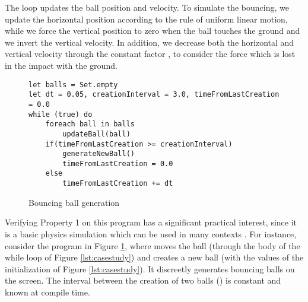 The  loop updates the ball position and velocity. 
To simulate the bouncing, we update the horizontal position according to the rule of uniform linear motion, while we force the vertical position to zero when the ball touches the ground and we invert the vertical velocity. In addition, we decrease both the horizontal and vertical velocity through the constant factor , to consider the force which is lost in the impact with the ground.

\begin{figure}
\vspace{-15pt}
\begin{lstlisting}
let balls = Set.empty
let dt = 0.05, creationInterval = 3.0, timeFromLastCreation = 0.0
while (true) do
	foreach ball in balls
		updateBall(ball)	
	if(timeFromLastCreation >= creationInterval)
		generateNewBall()
		timeFromLastCreation = 0.0
	else
		timeFromLastCreation += dt
\end{lstlisting}
\caption{Bouncing ball generation}
\label{lst:casestudyExternal}
\end{figure}
\vspace{-15pt}

Verifying Property 1 on this program has a significant practical interest, since it is a basic physics simulation which can be used in many contexts \cite{E10}. For instance, consider the program in Figure \ref{lst:casestudyExternal}, where  moves the ball  (through the body of the while loop of Figure \ref{lst:casestudy}) and  creates a new ball (with the values of the initialization of Figure \ref{lst:casestudy}). It discreetly generates bouncing balls on the screen. The interval between the creation of two balls () is constant and known at compile time.

